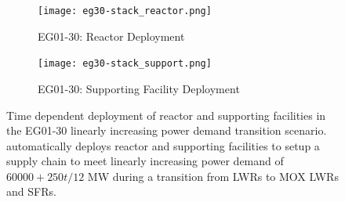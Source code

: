     \begin{figure}[]
        \centering
        \begin{subfigure}[t]{\textwidth}
            \centering
            \texttt{[image: eg30-stack\_reactor.png]} 
            \caption{EG01-30: Reactor Deployment}
            \label{fig:30reactor}
        \end{subfigure}
        \vspace{1cm}
        \begin{subfigure}[t]{\textwidth}
            \centering
            \texttt{[image: eg30-stack\_support.png]} 
            \caption{EG01-30: Supporting Facility Deployment}
            \label{fig:30support}
        \end{subfigure}
        \hfill
        \caption{Time dependent deployment of reactor and supporting facilities in 
        the EG01-30 linearly increasing power demand transition scenario. 
        \deploy automatically deploys reactor and supporting facilities 
        to setup a supply chain to meet linearly increasing power demand of $60000 + 250t/12$ MW
        during a transition from \glspl{LWR} to MOX LWRs and \glspl{SFR}. }
        \label{fig:30stack}
    \end{figure}
